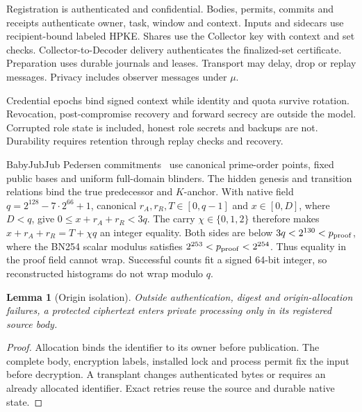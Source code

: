 \documentclass[conference,compsoc]{IEEEtran}
\theoremstyle{definition}
\numberwithin{equation}{section}
\numberwithin{table}{section}
\numberwithin{figure}{section}
\theoremstyle{plain}
\newtheorem{lemma}{Lemma}[section]
\newtheorem{lemma}{Lemma}
\begin{document}
Registration is authenticated and confidential. Bodies, permits, commits and
receipts authenticate owner, task, window and context. Inputs and sidecars use
recipient-bound labeled HPKE. Shares use the Collector key with context and
set checks. Collector-to-Decoder delivery authenticates the finalized-set
certificate. Preparation uses durable journals and leases. Transport may
delay, drop or replay messages. Privacy includes observer messages under \(\mu\).

Credential epochs bind signed context while identity and quota survive rotation.
Revocation, post-compromise recovery and forward secrecy are outside the model.
Corrupted role state is included, honest role secrets and backups are not.
Durability requires retention through replay checks and recovery.

\label{app:native-interface}
BabyJubJub Pedersen commitments~\cite{Pedersen1991Commitment} use canonical
prime-order points, fixed public bases and uniform full-domain blinders.
The hidden genesis and transition relations bind the true predecessor and
\(K\)-anchor. With native field
\(q=2^{128}-7\cdot2^{66}+1\), canonical \(r_A,r_R,T\in[0,q-1]\)
and \(x\in[0,D]\), where \(D<q\), give
\(0\le x+r_A+r_R<3q\). The carry \(\chi\in\{0,1,2\}\) therefore
makes \(x+r_A+r_R=T+\chi q\) an integer equality. Both sides are below
\(3q<2^{130}<p_{\rm proof}\), where the BN254 scalar modulus satisfies
\(2^{253}<p_{\rm proof}<2^{254}\). Thus equality in the proof field
cannot wrap. Successful counts fit a signed 64-bit integer,
so reconstructed histograms do not wrap modulo \(q\).

\begin{lemma}[Origin isolation]
\label{lem:origin-isolation}
Outside authentication, digest and origin-allocation failures, a protected
ciphertext enters private processing only in its registered source body.
\end{lemma}
\begin{proof}
Allocation binds the identifier to its owner before publication. The complete
body, encryption labels, installed lock and process permit fix the input before
decryption. A transplant changes authenticated bytes or requires an already
allocated identifier. Exact retries reuse the source and durable native state.
\end{proof}
\end{document}
